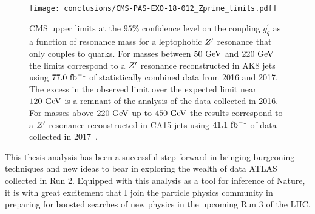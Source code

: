 \begin{figure}[htbp]
 \centering
 \texttt{[image: conclusions/CMS-PAS-EXO-18-012\_Zprime\_limits.pdf]}
 \caption[CMS upper limits at $95\%$ CL on the coupling $g_{q}^{\prime}$ as a function of resonance mass for a leptophobic $\Zprime$ resonance that only couples to quarks using $77.0~\ifb$.]{%
  CMS upper limits at the $95\%$ confidence level on the coupling $g_{q}^{\prime}$ as a function of resonance mass for a leptophobic $\Zprime$ resonance that only couples to quarks.
  For masses between $50~\mathrm{GeV}$ and $220~\mathrm{GeV}$ the limits correspond to a $\Zprime$ resonance reconstructed in AK8 jets using $77.0~\ifb$ of statistically combined data from 2016 and 2017.
  The excess in the observed limit over the expected limit near $120~\mathrm{GeV}$ is a remnant of the analysis of the data collected in 2016.
  For masses above $220~\mathrm{GeV}$ up to $450~\mathrm{GeV}$ the results correspond to a $\Zprime$ resonance reconstructed in CA15 jets using $41.1~\mathrm{fb}^{-1}$ of data collected in 2017~\cite{CMS:2019hlx}.
 }
 \label{fig:CMS-PAS-EXO-18-012_Zprime_limits}
\end{figure}

This thesis analysis has been a successful step forward in bringing burgeoning techniques and new ideas to bear in exploring the wealth of data ATLAS collected in Run 2.
Equipped with this analysis as a tool for inference of Nature, it is with great excitement that I join the particle physics community in preparing for boosted searches of new physics in the upcoming Run 3 of the LHC.
